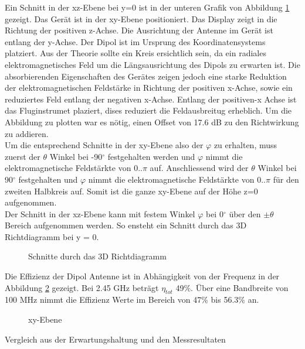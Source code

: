 Ein Schnitt in der xz-Ebene bei y=0 ist in der unteren Grafik von Abbildung \ref{fig:Schnittgemessen} gezeigt. Das Gerät ist in der xy-Ebene positioniert. Das Display zeigt in die Richtung der positiven z-Achse. Die Ausrichtung der Antenne im Gerät ist entlang der y-Achse. Der Dipol ist im Ursprung des Koordinatensystems platziert. Aus der Theorie sollte ein Kreis ersichtlich sein, da ein radiales elektromagnetisches Feld um die Längsausrichtung des Dipols zu erwarten ist. Die absorbierenden Eigenschaften des Gerätes zeigen jedoch eine starke Reduktion der elektromagnetischen Feldstärke in Richtung der positiven x-Achse, sowie ein reduziertes Feld entlang der negativen x-Achse. Entlang der positiven-x Achse ist das Fluginstrumet plaziert, dises reduziert die Feldausbreitug erheblich. Um die Abbildung zu plotten war es nötig, einen Offset von 17.6 dB zu den Richtwirkung zu addieren.\\
Um die entsprechend Schnitte in der  xy-Ebene also  der $\varphi$ zu erhalten, muss zuerst der $\theta$ Winkel bei -90$^\circ$ festgehalten werden und $\varphi$ nimmt die elektromagnetische Feldstärkte von $0..\pi$ auf. Anschliessend wird der $\theta$ Winkel bei 90$^\circ$ festgehalten  und $\varphi$ nimmt die elektromagnetische Feldstärkte von $0..\pi$ für den zweiten Halbkreis auf. Somit ist die ganze xy-Ebene auf der Höhe z=0 aufgenommen.\\
Der Schnitt in der xz-Ebene kann mit festem Winkel $\varphi$ bei 0$^\circ$ über den  $\pm \theta$ Bereich aufgenommen werden. So ensteht ein Schnitt durch das 3D Richtdiagramm bei y = 0.
\begin{figure}[!h]
	\centering
	\begingroup
	
	\endgroup
	\caption{Schnitte durch das 3D Richtdiagramm}
	\label{fig:Schnittgemessen}
\end{figure}
\newpage
Die Effizienz der Dipol Antenne ist in Abhängigkeit von der Frequenz in der Abbildung \ref{fig:Effizienz_gemessen} gezeigt. Bei 2.45 GHz beträgt $\eta_{tot}$  49$\%$. Über eine Bandbreite von 100 MHz nimmt die Effizienz Werte im Bereich von 47$\%$ bis 56.3$\%$ an.\\
\begin{figure}[!h]
	\centering
	\begingroup
	
	\endgroup
	\caption{xy-Ebene}\label{fig:Effizienz_gemessen}
\end{figure}

Vergleich aus der Erwartungshaltung und den Messresultaten

